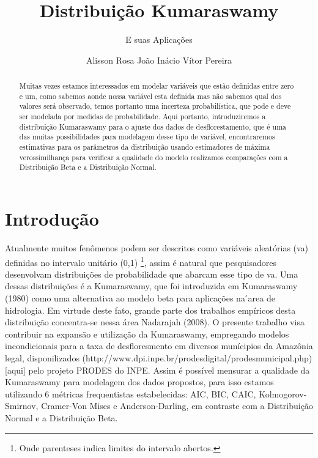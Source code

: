 \documentclass[
]{article}
\title{Distribuição Kumaraswamy}
\subtitle{E suas Aplicações}
\author{Alisson Rosa João Inácio Vítor Pereira}
\date{}
\begin{document}
\maketitle
\begin{abstract}
Muitas vezes estamos interessados em modelar variáveis que estão
definidas entre zero e um, como sabemos aonde nossa variável esta
definida mas não sabemos qual dos valores será observado, temos portanto
uma incerteza probabilística, que pode e deve ser modelada por medidas
de probabilidade. Aqui portanto, introduziremos a distribuição
Kumaraswamy para o ajuste dos dados de desflorestamento, que é uma das
muitas possibilidades para modelagem desse tipo de variável,
encontraremos estimativas para os parâmetros da distribuição usando
estimadores de máxima verossimilhança para verificar a qualidade do
modelo realizamos comparações com a Distribuição Beta e a Distribuição
Normal.
\end{abstract}
\ifdefined\Shaded\renewenvironment{Shaded}{\begin{tcolorbox}[frame hidden, sharp corners, interior hidden, breakable, enhanced, borderline west={3pt}{0pt}{shadecolor}, boxrule=0pt]}{\end{tcolorbox}}\fi

\section{\centering Introdução}

Atualmente muitos fenômenos podem ser descritos como variáveis
aleatórias (va) definidas no intervalo unitário (0,1) \footnote{Onde
  parenteses indica limites do intervalo abertos.}, assim é natural que
pesquisadores desenvolvam distribuições de probabilidade que abarcam
esse tipo de va. Uma dessas distribuições é a Kumaraswamy, que foi
introduzida em Kumaraswamy (1980) como uma alternativa ao modelo beta
para aplicações na ́area de hidrologia. Em virtude deste fato, grande
parte dos trabalhos empíricos desta distribuição concentra-se nessa área
Nadarajah (2008). O presente trabalho visa contribuir na expansão e
utilização da Kumaraswamy, empregando modelos incondicionais para a taxa
de desfloresmento em diversos munícipios da Amazônia legal,
disponilizados
(http://www.dpi.inpe.br/prodesdigital/prodesmunicipal.php){[}aqui{]}
pelo projeto PRODES do INPE. Assim é possível mensurar a qualidade da
Kumaraswamy para modelagem dos dados propostos, para isso estamos
utilizando 6 métricas frequentistas estabelecidas: AIC, BIC, CAIC,
Kolmogorov-Smirnov, Cramer-Von Mises e Anderson-Darling, em contraste
com a Distribuição Normal e a Distribuição Beta.
\end{document}
